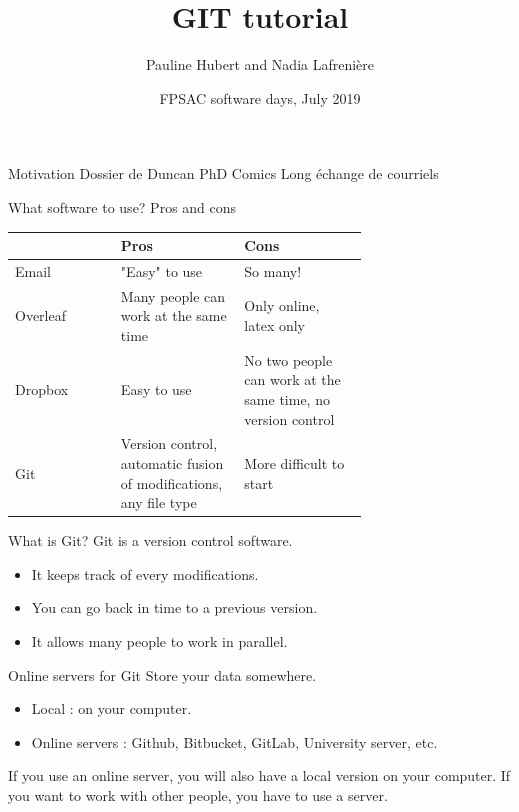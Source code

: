 \documentclass{beamer}
\title{GIT tutorial}
\author{Pauline Hubert and Nadia Lafrenière}
\date{FPSAC software days, July 2019}
\begin{document}
	\maketitle
	\begin{frame}{Motivation}
		Dossier de Duncan
		\pause
		PhD Comics
		\pause
		Long échange de courriels
	\end{frame}
	\begin{frame}{What software to use? Pros and cons}
		\begin{tabular}{lp{0.35\linewidth}p{0.35\linewidth}}
			& Pros & Cons\\
			\hline
			Email & "Easy" to use & So many!\\
			\hline
			Overleaf & Many people can work at the same time & Only online, latex only\\
			\hline
			Dropbox & Easy to use & No two people can work at the same time, no version control\\
			\hline
			Git & Version control, automatic fusion of modifications, any file type & More difficult to start\\
		\end{tabular}
	\end{frame}
	\begin{frame}{What is Git?}
		Git is a version control software. \newline
		
		\begin{itemize}
			\item It keeps track of every modifications.
			\item You can go back in time to a previous version.
			\item It allows many people to work in parallel.
		\end{itemize}	
	\end{frame}
	\begin{frame}{Online servers for Git}
		Store your data somewhere. \newline 
			\begin{itemize}
				\item Local : on your computer.
				\item Online servers : Github, Bitbucket, GitLab, University server, etc. \newline
			\end{itemize}
		If you use an online server, you will also have a local version on your computer. If you want to work with other people, you have to use a server. 
	\end{frame}
\end{document}
